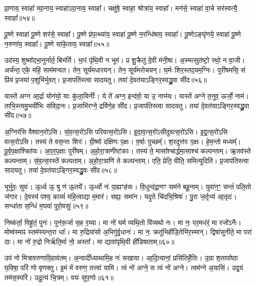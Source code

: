 प्रा॒णाय॒ स्वाहा᳚ व्या॒नाय॒ स्वाहा॑ऽपा॒नाय॒ स्वाहा᳚। 
चक्षु॑षे॒ स्वाहा॒ श्रोत्रा॑य॒ स्वाहा᳚। 
मन॑से॒ स्वाहा॑ वा॒चे सर॑स्वत्यै॒ स्वाहा᳚॥५४॥%
\anuvakamend

पू॒ष्णे स्वाहा॑ पू॒ष्णे शर॑से॒ स्वाहा᳚। 
पू॒ष्णे प्र॑प॒त्थ्या॑य॒ स्वाहा॑ पू॒ष्णे न॒रन्धि॑षाय॒ स्वाहा᳚। 
पू॒ष्णेऽङ्घृ॑णये॒ स्वाहा॑ पू॒ष्णे न॒रुणा॑य॒ स्वाहा᳚। 
पू॒ष्णे सा॑के॒ताय॒ स्वाहा᳚॥५५॥
\anuvakamend


उद॑स्य॒ शुष्मा᳚द्भा॒नुर्नार्त॒ बिभ॑र्ति। 
भा॒रं पृ॑थि॒वी न भूम॑। 
प्र शु॒क्रैतु॑ दे॒वी म॑नी॒षा। 
अ॒स्मत्सुत॑ष्टो॒ रथो॒ न वा॒जी। 
अर्च॑न्त॒ एके॒ महि॒ साम॑मन्वत। 
तेन॒ सूर्य॑मधारयन्। 
तेन॒ सूर्य॑मरोचयन्। 
घ॒र्मः  शिर॒स्तद॒यम॒ग्निः। 
पुरी॑षमसि॒ सं प्रि॑यं प्र॒जया॑ प॒शुभि॑र्भुवत्। 
प्र॒जापति॑स्त्वा सादयतु। 
तया॑ दे॒वत॑याऽङ्गिर॒स्वद्ध्रु॒वा सी॑द॥५६॥
\anuvakamend

यास्ते॑ अग्न आ॒र्द्रा योन॑यो॒ याः कु॑ला॒यिनीः᳚। 
ये ते॑ अग्न॒ इन्द॑वो॒ या उ॒ नाभ॑यः। 
यास्ते॑ अग्ने त॒नुव॒ ऊर्जो॒ नाम॑। 
ताभि॒स्त्वमु॒भयी॑भिः संविदा॒नः। 
प्र॒जाभि॑रग्ने॒ द्रवि॑णे॒ह सी॑द। 
प्र॒जाप॑तिस्त्वा सादयतु। 
तया॑ दे॒वत॑याऽङ्गिर॒स्वद्ध्रु॒वा सी॑द॥५७॥
\anuvakamend

अ॒ग्निर॑सि वैश्वान॒रो॑ऽसि। 
सं॒व॒त्स॒रो॑ऽसि परिवत्स॒रो॑ऽसि। 
इ॒दा॒व॒त्स॒रो॑ऽसीदुवत्स॒रो॑ऽसि। 
इ॒द्व॒त्स॒रो॑ऽसि वत्स॒रो॑ऽसि। 
तस्य॑ ते वस॒न्तः  शिरः॑। 
ग्री॒ष्मो दक्षि॑णः प॒क्षः। 
व॒र्\mbox{}षाः पुच्छम्᳚। 
श॒रदुत्त॑रः प॒क्षः। 
हे॒म॒न्तो मध्यम्᳚। 
पू॒र्व॒प॒क्षाश्चित॑यः। 
अ॒प॒र॒प॒क्षाः पुरी॑षम्। 
अ॒हो॒रा॒त्राणीष्ट॑काः। 
तस्य॑ ते॒ मासा᳚श्चार्द्धमा॒साश्च॑ कल्पन्ताम्। 
ऋ॒तव॑स्ते कल्पन्ताम्। 
सं॒व॒त्स॒रस्ते॑ कल्पताम्। 
अ॒हो॒रा॒त्राणि॑ ते कल्पन्ताम्। 
एति॒ प्रेति॒ वीति॒ समित्युदिति॑। 
प्र॒जाप॑तिस्त्वा सादयतु। 
तया॑ दे॒वत॑याऽङ्गिर॒स्वद्ध्रु॒वः सी॑द॥५८॥
\anuvakamend[चित॑यो॒ नव॑ च]


भूर्भुवः॒ सुवः॑। 
ऊ॒र्ध्व ऊ॒ षु ण॑ ऊ॒तये᳚। 
ऊ॒र्ध्वो नः॑ पा॒ह्यꣳह॑सः। 
वि॒धुन्द॑द्रा॒णꣳ सम॑ने बहू॒नाम्। 
युवा॑न॒ꣳ॒ सन्तं॑ पलि॒तो ज॑गार। 
दे॒वस्य॑ पश्य॒ काव्यं॑ महि॒त्वाद्या म॒मार॑। 
सह्यः॒ समा॑न। 
यदृ॒ते चि॑दभि॒श्रिषः॑। 
पु॒रा ज॒र्तृभ्य॑ आ॒तृदः॑। 
सन्धा॑ता स॒न्धिं म॒घवा॑ पुरो॒वसुः॑॥५९॥

निष्क॑र्ता॒ विह्रु॑तं॒ पुनः॑। 
पुन॑रू॒र्जा स॒ह र॒य्या। 
मा नो॑ घर्म व्यथि॒तो वि॑व्यथो नः। 
मा नः॒ पर॒मध॑रं॒ मा रजो॑ऽनैः। 
मोष्व॑स्माꣴ स्तम॑स्यन्त॒रा धाः᳚। 
मा रु॒द्रिया॑सो अ॒भिगु॑र्वृ॒धानः॑। 
मा नः॒ क्रतु॑भिर्\mbox{}हीडि॒तेभि॑र॒स्मान्। 
द्विषा॑सुनीते॒ मा परा॑ दाः। 
मा नो॑ रु॒द्रो निर्\mbox{}ऋ॑ति॒र्मा नो॒ अस्ता᳚। 
मा द्यावा॑पृथि॒वी ही॑डिषाताम्॥६०॥

उप॑ नो मित्रावरुणावि॒हाव॑तम्। 
अ॒न्वादी᳚ध्याथामि॒ह नः॑ सखाया। 
आ॒दि॒त्यानां॒ प्रसि॑तिर्\mbox{}हे॒तिः। 
उ॒ग्रा श॒तापा᳚ष्ठा घ॒विषा॒ परि॑ णो वृणक्तु। 
इ॒मं मे॑ वरुण॒ तत्त्वा॑ यामि। 
त्वं नो॑ अग्ने॒ स त्वं नो॑ अग्ने। 
त्वम॑ग्ने अ॒यासि॑। 
उद्व॒यं तम॑स॒स्परि॑। 
उदु॒त्यं चि॒त्रम्। 
वयः॑ सुप॒र्णाः॥६१॥
\anuvakamend[पु॒रो॒वसु॑र्\mbox{}हीडिषाताꣳ सुप॒र्णाः]


